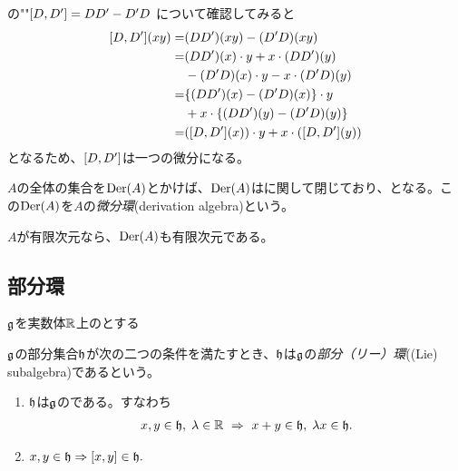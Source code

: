 \documentclass[fleqn,twocolumn,titlepage,dvipdfmx]{jsarticle}
\begin{document}
\begin{remark}
  {}の"{}"$\comm{D}{D^\prime}=DD^\prime-D^\prime D$ について確認してみると
  \begin{align*}
    \comm{D}{D^\prime}(xy) =& \qty(DD^\prime)(xy)-\qty(D^\prime D)(xy)\\
    =& \qty(DD^\prime)(x)\cdot y + x\cdot\qty(DD^\prime)(y) \\
    & -\qty(D^\prime D)(x)\cdot y - x\cdot\qty(D^\prime D)(y)\\
    =& \qty{\qty(DD^\prime)(x)-\qty(D^\prime D)(x)}\cdot y\\
    & + x\cdot\qty{\qty(DD^\prime)(y) - \qty(D^\prime D)(y)}\\
    =& \qty(\comm{D}{D^\prime}(x))\cdot y + x\cdot\qty(\comm{D}{D^\prime}(y))
  \end{align*}
  となるため、$\comm{D}{D^\prime}$は一つの微分になる。
\end{remark}

\begin{definition}[微分環]\label{Def:der_alg}
  $A$の{}全体の集合を$\operatorname{Der}(A)$とかけば、$\operatorname{Der}(A)$は{}に関して閉じており、{}となる。この$\operatorname{Der}(A)$を$A$の\emph{微分環}(derivation algebra)という。
\end{definition}

\begin{remark}
  $A$が有限次元なら、\href{Def:der_alg}{$\operatorname{Der}(A)$}も有限次元である。
\end{remark}


\clearpage
{}

\subsection{部分環}
$\mathfrak{g}$を実数体$\mathbb{R}$上の{}とする

\begin{definition}[部分リー環]\label{Def:2_1}
  $\mathfrak{g}$の部分集合$\mathfrak{h}$が次の二つの条件を満たすとき、$\mathfrak{h}$は$\mathfrak{g}$の\emph{部分（リー）環}((Lie) subalgebra)であるという。
  \begin{enumerate}[label=(\roman*)]
    \item \label{Def:2_1_i}$\mathfrak{h}$は$\mathfrak{g}$の{}である。すなわち
      \begin{align*}
        x,y\in\mathfrak{h},\;\lambda\in\mathbb{R}~\Rightarrow~ x+y\in\mathfrak{h},\;\lambda x\in\mathfrak{h}.
      \end{align*}
    \item \label{Def:2_1_ii}$x,y\in\h\Rightarrow\comm{x}{y}\in\h.$
  \end{enumerate}
\end{definition}
\end{document}
